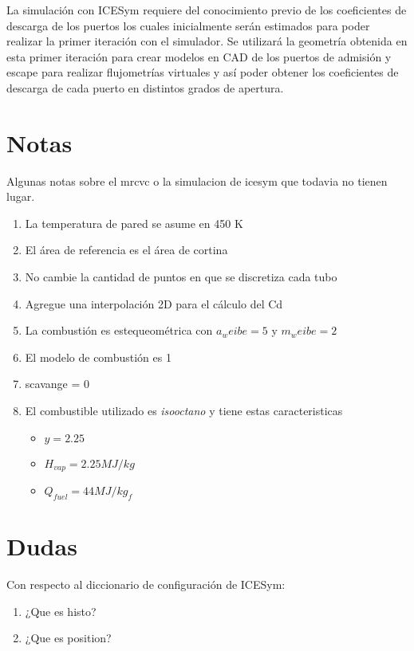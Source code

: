 La simulación con ICESym requiere del conocimiento previo de los coeficientes
de descarga de los puertos los cuales inicialmente serán estimados para poder
realizar la primer iteración con el simulador.
%
Se utilizará la geometría obtenida en esta primer iteración para crear modelos
en CAD de los puertos de admisión y escape para realizar flujometrías virtuales
y así poder obtener los coeficientes de descarga de cada puerto en distintos
grados de apertura.




\section{Notas}
Algunas notas sobre el mrcvc o la simulacion de icesym que todavia no tienen
lugar.

\begin{enumerate}
    \item La temperatura de pared se asume en 450 K
    \item El área de referencia es el área de cortina
    \item No cambie la cantidad de puntos en que se discretiza cada tubo
    \item Agregue una interpolación 2D para el cálculo del Cd
    \item La combustión es estequeométrica con $a_weibe=5$ y $m_weibe=2$
    \item El modelo de combustión es 1
    \item scavange = 0
    \item El combustible utilizado es \emph{isooctano} y tiene estas
        caracteristicas 
        \begin{itemize}
            \item $y = 2.25$
            \item $H_{vap} = 2.25 MJ/kg$
            \item $Q_{fuel} = 44 MJ/kg_f$
        \end{itemize}
\end{enumerate}

\section{Dudas}
Con respecto al diccionario de configuración de ICESym:

\begin{enumerate}
    \item ¿Que es histo?
    \item ¿Que es position?
\end{enumerate}

